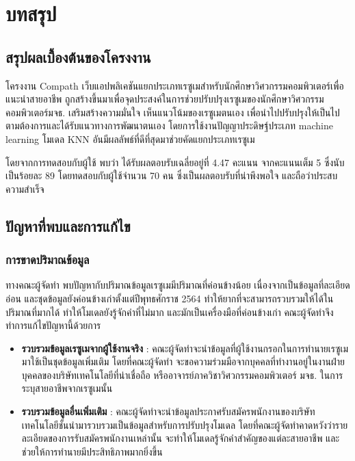 \chapter{บทสรุป}

\section{สรุปผลเบื้องต้นของโครงงาน}
\par{
    โครงงาน Compath เว็บแอปพลิเคชันแยกประเภทเรซูเมสำหรับนักศึกษาวิศวกรรมคอมพิวเตอร์เพื่อแนะนำสายอาชีพ
    ถูกสร้างขึ้นมาเพื่อจุดประสงค์ในการช่วยปรับปรุงเรซูเมของนักศึกษาวิศวกรรมคอมพิวเตอร์มจธ. เสริมสร้างความมั่นใจ เห็นแนวโน้มของเรซูเมตนเอง เพื่อนำไปปรับปรุงให้เป็นไปตามต้องการและได้รับแนวทางการพัฒนาตนเอง
    โดยการใช้งานปัญญาประดิษฐ์ประเภท machine learning โมเดล KNN อันมีผลลัพธ์ที่ดีที่สุดมาช่วยคัดแยกประเภทเรซูเม
    
    โดยจากการทดสอบกับผู้ใช้ พบว่า ได้รับผลตอบรับเฉลี่ยอยู่ที่ 4.47 คะแนน จากคะแนนเต็ม 5 ซึ่งนับเป็นร้อยละ 89 โดยทดสอบกับผู้ใช้จำนวน 70 คน ซึ่งเป็นผลตอบรับที่น่าพึงพอใจ และถือว่าประสบความสำเร็จ
}

\section{ปัญหาที่พบและการแก้ไข}
\subsection{การขาดปริมาณข้อมูล}
ทางคณะผู้จัดทำ พบปัญหากับปริมาณข้อมูลเรซูเมมีปริมาณที่ค่อนข้างน้อย\cite{dataset} 
เนื่องจากเป็นข้อมูลที่ละเอียดอ่อน และชุดข้อมูลยังค่อนข้างเก่าตั้งแต่ปีพุทธศักราช 2564 ทำให้ยากที่จะสามารถรวบรวมให้ได้ในปริมาณที่มากได้ ทำให้โมเดลยังรู้จักคำที่ไม่มาก และมักเป็นเครื่องมือที่ค่อนข้างเก่า
คณะผู้จัดทำจึงทำการแก้ไขปัญหานี้ด้วยการ
\begin{itemize}
    \item \textbf{รวบรวมข้อมูลเรซูเมจากผู้ใช้งานจริง} : คณะผู้จัดทำจะนำข้อมูลที่ผู้ใช้งานกรอกในการทำนายเรซูเมมาใช้เป็นชุดข้อมูลเพิ่มเติม โดยที่คณะผู้จัดทำ
จะขอความร่วมมือจากบุคคลที่ทำงานอยู่ในงานฝ่ายบุคคลของบริษัทเทคโนโลยีที่น่าเชื่อถือ หรืออาจารย์ภาควิชาวิศวกรรมคอมพิวเตอร์ มจธ. ในการระบุสายอาชีพจากเรซูเมนั้น
    \item \textbf{รวบรวมข้อมูลอื่นเพิ่มเติม} : คณะผู้จัดทำจะนำข้อมูลประกาศรับสมัครพนักงานของบริษัทเทคโนโลยีชั้นนำมารวบรวมเป็นข้อมูลสำหรับการปรับปรุงโมเดล
โดยที่คณะผู้จัดทำคาดหวังว่ารายละเอียดของการรับสมัครพนักงานเหล่านั้น จะทำให้โมเดลรู้จักคำสำคัญของแต่ละสายอาชีพ และช่วยให้การทำนายมีประสิทธิภาพมากยิ่งขึ้น
\end{itemize}
